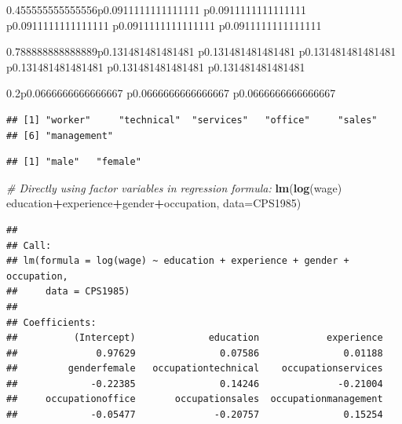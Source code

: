 \documentclass[]{book}
\newenvironment{Shaded}{\begin{snugshade}}{\end{snugshade}}
\newcommand{\CommentTok}[1]{\textcolor[rgb]{0.56,0.35,0.01}{\textit{#1}}}
\newcommand{\DataTypeTok}[1]{\textcolor[rgb]{0.13,0.29,0.53}{#1}}
\newcommand{\KeywordTok}[1]{\textcolor[rgb]{0.13,0.29,0.53}{\textbf{#1}}}
\newcommand{\NormalTok}[1]{#1}
\newcommand{\OperatorTok}[1]{\textcolor[rgb]{0.81,0.36,0.00}{\textbf{#1}}}
\newcommand{\StringTok}[1]{\textcolor[rgb]{0.31,0.60,0.02}{#1}}
\begin{document}
\begin{tabularx}{0.455555555555556\textwidth}{p{} p{} p{} p{} p{}}
\begin{tabularx}{0.788888888888889\textwidth}{p{} p{} p{} p{} p{} p{}}
\begin{tabularx}{0.2\textwidth}{p{} p{} p{}}
\begin{verbatim}
## [1] "worker"     "technical"  "services"   "office"     "sales"     
## [6] "management"
\end{verbatim}

\begin{Shaded}
\end{Shaded}

\begin{verbatim}
## [1] "male"   "female"
\end{verbatim}

\begin{Shaded}
\begin{Highlighting}[]
\CommentTok{# Directly using factor variables in regression formula:}
\KeywordTok{lm}\NormalTok{(}\KeywordTok{log}\NormalTok{(wage) }\OperatorTok{~}\StringTok{ }\NormalTok{education}\OperatorTok{+}\NormalTok{experience}\OperatorTok{+}\NormalTok{gender}\OperatorTok{+}\NormalTok{occupation, }\DataTypeTok{data=}\NormalTok{CPS1985)}
\end{Highlighting}
\end{Shaded}

\begin{verbatim}
## 
## Call:
## lm(formula = log(wage) ~ education + experience + gender + occupation, 
##     data = CPS1985)
## 
## Coefficients:
##          (Intercept)             education            experience  
##              0.97629               0.07586               0.01188  
##         genderfemale   occupationtechnical    occupationservices  
##             -0.22385               0.14246              -0.21004  
##     occupationoffice       occupationsales  occupationmanagement  
##             -0.05477              -0.20757               0.15254
\end{verbatim}

\begin{Shaded}
\end{Shaded}
\end{tabularx}
\end{tabularx}
\end{tabularx}
\end{document}

